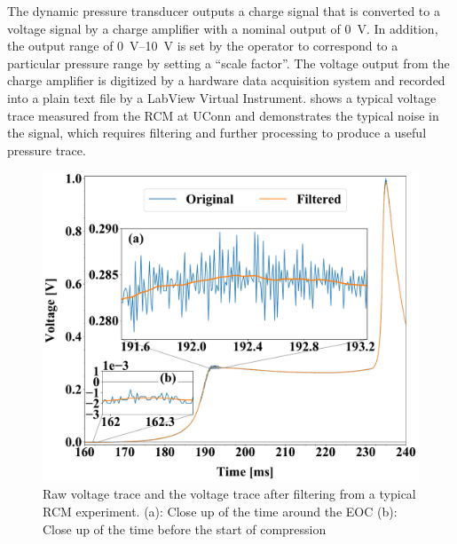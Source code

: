 \documentclass[12pt]{../ussci}
\begin{document}
The dynamic pressure transducer outputs a charge signal that is converted to a
voltage signal by a charge amplifier with a nominal output of \SI{0}{\V}. In
addition, the output range of \SIrange{0}{10}{\V} is set by the operator to
correspond to a particular pressure range by setting a ``scale factor''. The
voltage output from the charge amplifier is digitized by a hardware data
acquisition system and recorded into a plain text file by a LabView Virtual
Instrument.  shows a typical voltage trace measured from
the RCM at UConn and demonstrates the typical noise in the signal, which
requires filtering and further processing to produce a useful pressure trace.

\begin{figure}[htbp]
    \begin{minipage}[t]{0.48\textwidth}
        \centering
        \includegraphics[width=\linewidth]{figures/raw-voltage.pdf}
        \caption{Raw voltage trace and the voltage trace after filtering from a typical
        RCM experiment. (a): Close up of the
        time around the EOC (b): Close up of the time before the start of
        compression}
        \label{fig:raw-voltage}
    \end{minipage}\hfill%
    \begin{minipage}[t]{0.48\textwidth}
        \centering

\end{minipage}
\end{figure}
\end{document}
